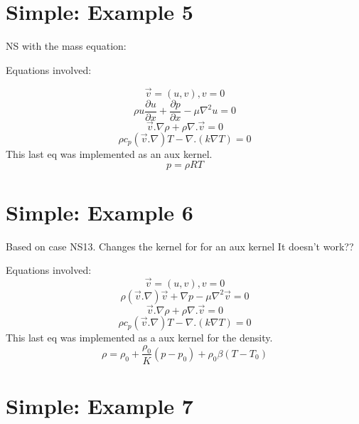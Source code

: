 \documentclass[11pt,letterpaper]{article}
\begin{document}
\section{Simple: Example 5}

NS with the mass equation:

Equations involved:

\begin{equation}
\vec{v}=(u,v), v = 0
\end{equation}
\begin{equation}
\rho u\frac{\partial u}{\partial x} + \frac{\partial p}{\partial x} - \mu \nabla^{2}u = 0
\end{equation}
\begin{equation}
\vec{v}.\nabla \rho + \rho \nabla.\vec{v}=0
\end{equation}
\begin{equation}
\rho c_{p} (\vec{v}.\nabla)T - \nabla .(k\nabla T) = 0
\end{equation}
This last eq was implemented as an aux kernel.
\begin{equation}
p = \rho R T
\end{equation}

\section{Simple: Example 6}

Based on case NS13. Changes the kernel for \rho for an aux kernel
It doesn't work??

Equations involved:
\begin{equation}
\vec{v}=(u,v), v = 0
\end{equation}
\begin{equation}
\rho (\vec{v}.\nabla)\vec{v} + \nabla p - \mu \nabla^{2}\vec{v} = 0
\end{equation}
\begin{equation}
\vec{v}.\nabla \rho + \rho \nabla.\vec{v}=0
\end{equation}
\begin{equation}
\rho c_{p} (\vec{v}.\nabla)T - \nabla .(k\nabla T) = 0
\end{equation}
This last eq was implemented as a aux kernel for the density.
\begin{equation}
\rho = \rho_{0} + \frac{\rho_{0}}{K}(p-p_{0}) + \rho_{0}\beta(T-T_{0})
\end{equation}

\section{Simple: Example 7}
\end{document}
